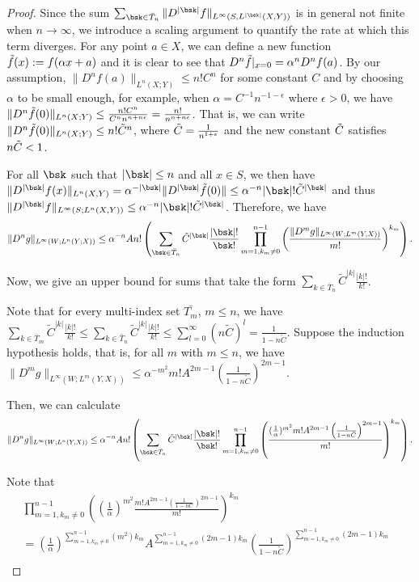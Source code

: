 \begin{proof}
Since the sum $ \sum_{\bsk\in \bar{T}_n}\|D^{|\bsk|}f\|_{L^\infty(S, L^{|\bsk|}(X,Y))}$ is in general not finite when $n\rightarrow\infty$, we introduce a scaling argument to quantify the rate at which this term diverges. For any point $a\in X$, we can define a new function $\Tilde{f}(x) := f(\alpha x + a)$ and it is clear to see that $D^n\Tilde{f}|_{x=0} = \alpha^nD^nf(a)$. By our assumption, $\|D^nf(a)\|_{L^n(X;Y)}\leq n!C^n$ for some constant $C$ and by choosing $\alpha$ to be small enough, for example, when $\alpha = C^{-1}n^{-1 - \epsilon}$ where $\epsilon > 0$, we have $\|D^n\Tilde{f}(0)\|_{L^n(X;Y)} \leq \frac{n!C^n}{C^nn^{n + n\epsilon}} = \frac{n!}{n^{n+n\epsilon}}$. That is, we can write $\|D^n\Tilde{f}(0)\|_{L^n(X;Y)} \leq n!\Tilde{C}^n$, where $\Tilde{C} = \frac{1}{n^{1 + \epsilon}}$ and the new constant $\Tilde{C}$ satisfies $n\Tilde{C} < 1$.  

For all $\bsk$ such that $|\bsk| \leq n$ and all $x\in S$, we then have $\|D^{|\bsk|}f(x)\|_{L^n(X,Y)} = \alpha^{-|\bsk|}\|D^{|\bsk|}\Tilde{f}(0)\| \leq \alpha^{-n}|\bsk|!\Tilde{C}^{|\bsk|}$ and thus $\|D^{|\bsk|}f\|_{L^\infty(S;L^n(X,Y))} \leq \alpha^{-n}|\bsk|!\Tilde{C}^{|\bsk|}$. Therefore, we have 
$$
\|D^ng\|_{L^\infty(W;L^n(Y;X))} \leq \alpha^{-n}An! \left ( \sum_{\bsk\in \bar{T}_n}\tilde{C}^{|\bsk|}\frac{|\bsk|!}{\bsk!} \prod_{m=1, k_m\neq 0}^{n-1} \left (\frac{\|D^m g\|_{L^\infty(W;L^m(Y,X))}}{m!} \right )^{k_m}\right).
$$ 

Now, we give an upper bound for sums that take the form $\sum_{k\in \bar{T}_n}\tilde{C}^{|k|}\frac{|k|!}{k!}$. 



Note that for every multi-index set $\bar{T_m}$, $m \leq n$, we have $\sum_{k\in \bar{T}_m}\tilde{C}^{|k|}\frac{|k|!}{k!}  \leq \sum_{k\in \bar{T}_n}\tilde{C}^{|k|}\frac{|k|!}{k!}\leq \sum_{l = 0}^\infty(n\tilde{C})^l = \frac{1}{1 - n\tilde{C}}$. Suppose the induction hypothesis holds, that is, for all $m$ with $m \leq n$, we have $\|D^mg\|_{L^\infty(W;L^m(Y,X))}\leq \alpha^{-m^2}m!A^{2m-1}\left(\frac{1}{1 - n\tilde{C}}\right)^{2m-1}$.

Then, we can calculate
$$
\|D^ng\|_{L^\infty(W;L^n(Y,X))} \leq \alpha^{-n}An! \left ( \sum_{\bsk\in \bar{T}_n}\tilde{C}^{|\bsk|}\frac{|\bsk|!}{\bsk!} \prod_{m=1, k_m\neq 0}^{n-1} \left (\frac{(\frac{1}{\alpha})^{m^2} m!A^{2m-1}\left(\frac{1}{1 - n\tilde{C}}\right)^{2m-1}}{m!} \right )^{k_m}\right).
$$ 

Note that 
\begin{align*}
\prod_{m=1, k_m\neq 0}^{n-1} \left ((\frac{1}{\alpha})^{m^2}\frac{m!A^{2m-1}\left(\frac{1}{1 - nC}\right)^{2m-1}}{m!} \right )^{k_m} &\\
= (\frac{1}{\alpha})^{\sum_{m=1, k_m\neq 0}^{n-1}(m^2)k_m} A^{\sum_{m=1, k_m\neq 0}^{n-1}(2m-1)k_m}\left(\frac{1}{1 - n\tilde{C}}\right)^{\sum_{m=1, k_m\neq 0}^{n-1}(2m-1)k_m}\\    
\end{align*}



\end{proof}
